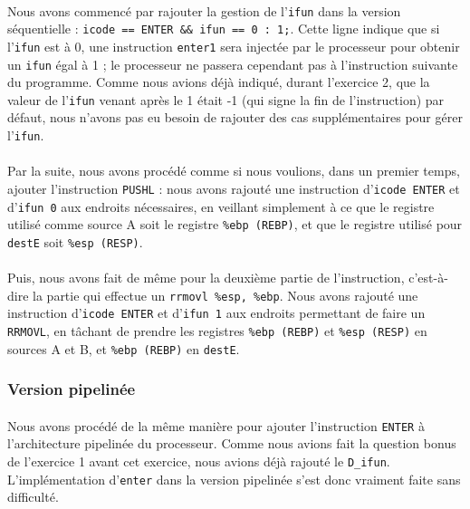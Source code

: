 \documentclass[12pt]{article}
\begin{document}
\paragraph{}Nous avons commencé par rajouter la gestion de l'\verb+ifun+  dans la version séquentielle : \verb+icode == ENTER && ifun == 0 : 1;+. Cette ligne indique que si l'\verb+ifun+ est à 0, une instruction \verb+enter1+ sera injectée par le processeur pour obtenir un \verb+ifun+ égal à 1 ; le processeur ne passera cependant pas à l'instruction suivante du programme. Comme nous avions déjà indiqué, durant l'exercice 2, que la valeur de l'\verb+ifun+ venant après le 1 était -1 (qui signe la fin de l'instruction) par défaut, nous n'avons pas eu besoin de rajouter des cas supplémentaires pour gérer l'\verb+ifun+.

\paragraph{}Par la suite, nous avons procédé comme si nous voulions, dans un premier temps, ajouter l'instruction \verb+PUSHL+ : nous avons rajouté une instruction d'\verb+icode ENTER+ et d'\verb+ifun 0+ aux endroits nécessaires, en veillant simplement à ce que le registre utilisé comme source A soit le registre \verb+%ebp (REBP)+, et que le registre utilisé pour \verb+destE+ soit \verb+%esp (RESP)+.

\paragraph{}Puis, nous avons fait de même pour la deuxième partie de l'instruction, c'est-à-dire la partie qui effectue un \verb+rrmovl %esp, %ebp+. Nous avons rajouté une instruction d'\verb+icode ENTER+ et d'\verb+ifun 1+ aux endroits permettant de faire un \verb+RRMOVL+, en tâchant de prendre les registres \verb+%ebp (REBP)+ et \verb+%esp (RESP)+ en sources A et B, et \verb+%ebp (REBP)+ en \verb+destE+.

\subsubsection{Version pipelinée}
\paragraph{}Nous avons procédé de la même manière pour ajouter l'instruction \verb+ENTER+ à l'architecture pipelinée du processeur. Comme nous avions fait la question bonus de l'exercice 1 avant cet exercice, nous avions déjà rajouté le \verb+D_ifun+. L'implémentation d'\verb+enter+ dans la version pipelinée s'est donc vraiment faite sans difficulté.
\end{document}
